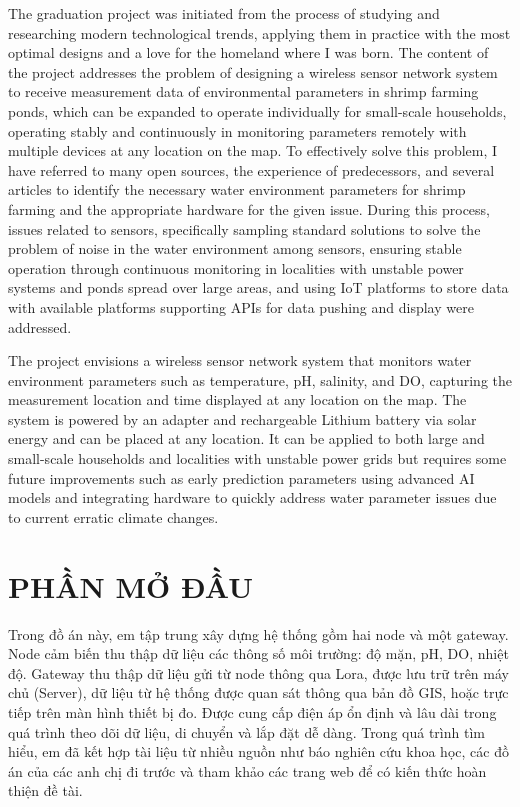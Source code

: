 The graduation project was initiated from the process of studying and researching modern technological trends, applying them in practice with the most optimal designs and a love for the homeland where I was born. The content of the project addresses the problem of designing a wireless sensor network system to receive measurement data of environmental parameters in shrimp farming ponds, which can be expanded to operate individually for small-scale households, operating stably and continuously in monitoring parameters remotely with multiple devices at any location on the map. To effectively solve this problem, I have referred to many open sources, the experience of predecessors, and several articles to identify the necessary water environment parameters for shrimp farming and the appropriate hardware for the given issue. During this process, issues related to sensors, specifically sampling standard solutions to solve the problem of noise in the water environment among sensors, ensuring stable operation through continuous monitoring in localities with unstable power systems and ponds spread over large areas, and using IoT platforms to store data with available platforms supporting APIs for data pushing and display were addressed.

The project envisions a wireless sensor network system that monitors water environment parameters such as temperature, pH, salinity, and DO, capturing the measurement location and time displayed at any location on the map. The system is powered by an adapter and rechargeable Lithium battery via solar energy and can be placed at any location. It can be applied to both large and small-scale households and localities with unstable power grids but requires some future improvements such as early prediction parameters using advanced AI models and integrating hardware to quickly address water parameter issues due to current erratic climate changes.

\cleardoublepage

\newpage
\section*{PHẦN MỞ ĐẦU}

Trong đồ án này, em tập trung xây dựng hệ thống gồm hai node và một gateway. Node cảm biến thu thập dữ liệu các thông số môi trường: độ mặn, pH, DO, nhiệt độ. Gateway thu thập dữ liệu gửi từ node thông qua Lora, được lưu trữ trên máy chủ (Server), dữ liệu từ hệ thống được quan sát thông qua bản đồ GIS, hoặc trực tiếp trên màn hình thiết bị đo. Được cung cấp điện áp ổn định và lâu dài trong quá trình theo dõi dữ liệu, di chuyển và lắp đặt dễ dàng. Trong quá trình tìm hiểu, em đã kết hợp tài liệu từ nhiều nguồn như báo nghiên cứu khoa học, các đồ án của các anh chị đi trước và tham khảo các trang web để có kiến thức hoàn thiện đề tài.

